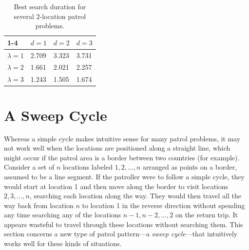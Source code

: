 \documentclass[11pt,a4paper]{article}
\begin{document}
\begin{table}[htb] 
\centering
\begin{tabular}{llll}
\cline{1-4}
 & $d =1$ & $d =2$ & $d =3$ \\ \hline
\multicolumn{1}{l}{$\lambda = 1$} & 2.709 & 3.323 & 3.731 \\ 
\multicolumn{1}{l}{$\lambda = 2$} & 1.661 & 2.021 & 2.257 \\ 
\multicolumn{1}{l}{$\lambda = 3$} & 1.243 & 1.505 & 1.674 \\ \hline
\end{tabular}
\caption{Best search duration for several 2-location patrol problems.} \label{table: homogeneous}
\end{table}


\section{A Sweep Cycle} \label{sec: a sweep cycle}
Whereas a simple cycle makes intuitive sense for many patrol problems, it may not work well when the locations are positioned along a straight line, which might occur if the patrol area is a border between two countries (for example).
Consider a set of $n$ locations labeled $1, 2, \ldots, n$ arranged as points on a border, assumed to be a line segment. 
If the patroller were to follow a simple cycle, they would start at location 1 and then move along the border to visit locations $2, 3, \ldots, n$, searching each location along the way. 
They would then travel all the way back from location $n$ to location 1 in the reverse direction without spending any time searching any of the locations $n-1, n-2, \ldots, 2$ on the return trip.
It appears wasteful to travel through these locations without searching them. This section concerns a new type of patrol pattern---a \textit{sweep cycle}---that intuitively works well for these kinds of situations.


\end{document}

